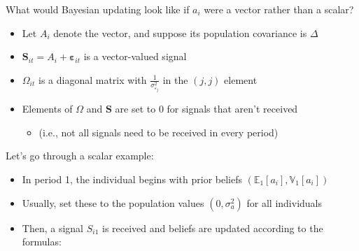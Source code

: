 \documentclass[aspectratio=169]{beamer}
\begin{document}
\begin{frame}
What would Bayesian updating look like if $a_i$ were a vector rather than a scalar?
\bigskip\par
\begin{itemize}
\itemsep1.5em
\item<2-> Let $A_i$ denote the vector, and suppose its population covariance is $\Delta$
\item<3-> $\mathbf{S}_{it} = A_i + \boldsymbol\varepsilon_{it}$ is a vector-valued signal
\end{itemize}
\begin{itemize}
\itemsep1.5em
\item<5-> $\Omega_{it}$ is a diagonal matrix with $\frac{1}{\sigma^2_{\varepsilon_j}}$ in the $(j,j)$ element
\item<6-> Elements of $\Omega$ and $\mathbf{S}$ are set to 0 for signals that aren't received
\bigskip\par
\begin{itemize}
\itemsep1.5em
\item<7-> (i.e., not all signals need to be received in every period)
\end{itemize}
\end{itemize}

\end{frame}

\begin{frame}
Let's go through a scalar example:
\bigskip\par
\begin{itemize}
\itemsep1.5em
\item<2-> In period 1, the individual begins with prior beliefs $(\mathbb{E}_1[a_i],\mathbb{V}_1[a_i])$
\item<3-> Usually, set these to the population values $(0,\sigma^2_a)$ for all individuals
\item<4-> Then, a signal $S_{i1}$ is received and beliefs are updated according to the formulas:
\end{itemize}


\end{frame}
\end{document}
